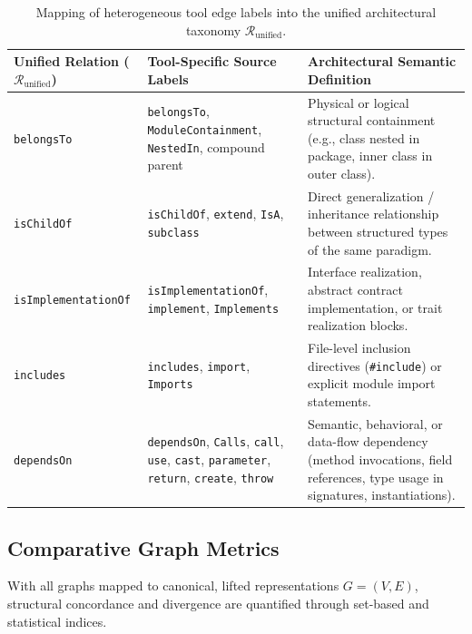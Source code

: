 \begin{table}[htpb]
  \centering
  \small
  \begin{adjustbox}{max width=\textwidth}
    \begin{tabular}{|l|l|L{7.5cm}|}
      \hline
      \textbf{Unified Relation ($\mathcal{R}_{\text{unified}}$)} &
      \textbf{Tool-Specific Source Labels} & \textbf{Architectural
      Semantic Definition} \\ \hline
      \texttt{belongsTo} & \texttt{belongsTo},
      \texttt{ModuleContainment}, \texttt{NestedIn}, compound parent
      & Physical or logical structural containment (e.g., class
      nested in package, inner class in outer class). \\ \hline
      \texttt{isChildOf} & \texttt{isChildOf}, \texttt{extend},
      \texttt{IsA}, \texttt{subclass} & Direct generalization /
      inheritance relationship between structured types of the same
      paradigm. \\ \hline
      \texttt{isImplementationOf} & \texttt{isImplementationOf},
      \texttt{implement}, \texttt{Implements} & Interface
      realization, abstract contract implementation, or trait
      realization blocks. \\ \hline
      \texttt{includes} & \texttt{includes}, \texttt{import},
      \texttt{Imports} & File-level inclusion directives
      (\texttt{\#include}) or explicit module import statements. \\ \hline
      \texttt{dependsOn} & \texttt{dependsOn}, \texttt{Calls},
      \texttt{call}, \texttt{use}, \texttt{cast}, \texttt{parameter},
      \texttt{return}, \texttt{create}, \texttt{throw} & Semantic,
      behavioral, or data-flow dependency (method invocations, field
      references, type usage in signatures, instantiations). \\ \hline
    \end{tabular}
  \end{adjustbox}
  \caption{Mapping of heterogeneous tool edge labels into
  the unified architectural taxonomy $\mathcal{R}_{\text{unified}}$.}
  \label{tab:edge_taxonomy_mapping}
\end{table}

\subsection{Comparative Graph Metrics}
\label{subsec:comparative_metrics}
\label{sec:evaluation_metrics}

With all graphs mapped to canonical, lifted representations $G = (V,
E)$, structural concordance and divergence are quantified through
set-based and statistical indices.

